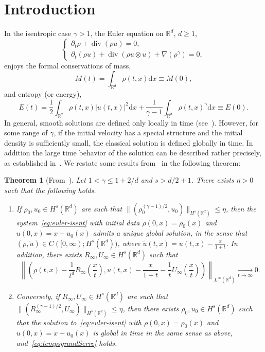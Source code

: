 \documentclass[11pt]{article}
\newtheorem{theo}{Theorem}[section]
\theoremstyle{definition}
\numberwithin{equation}{section}
\numberwithin{figure}{section}
\numberwithin{table}{section}
\DeclareMathOperator{\DIV}{div}
\newcommand*\R{\mathbb{R}}
\newcommand*\dd {\mathrm{d}}
\newcommand*\<{\left\langle}
\renewcommand*\>{\right\rangle}
\renewcommand*\le{\leqslant}
\renewcommand*\ge{\geqslant}
\newcommand*\Tend[2]{\mathop{\longrightarrow}\limits_{#1\rightarrow#2}}
\begin{document}
\section{Introduction}\label{sec:intro}

In the isentropic case $\gamma>1$, the Euler equation on $\R^d$, $d\ge 1$,
\begin{equation}\label{eq:euler-isent}
\begin{cases}
\partial_t \rho+\DIV\left(\rho u\right)=0,\\
\partial_t (\rho u) +\DIV(\rho u\otimes u)+\nabla
\left(\rho^\gamma\right)= 0,
\end{cases}
\end{equation}
enjoys the formal conservations of mass,
\begin{equation*}
M(t) =\int_{\R^d}\rho(t,x)\dd x\equiv M(0),
\end{equation*}
and entropy (or energy),
\begin{equation*}
E(t) = \frac{1}{2}\int_{\R^d} \rho (t,x) |u(t,x)|^2 \dd x+\frac{1}{\gamma-1}\int_{\R^d}\rho(t,x)^\gamma
\dd x \equiv E(0).
\end{equation*}
In general, smooth solutions are defined only locally in time (see~\cite{MUK86,JYC90,Xin98}). However, for some range of $\gamma$, if the initial velocity has a special structure and the initial density is sufficiently small, the classical solution is defined globally in time. In addition the large time behavior of the solution can be described rather precisely, as established in~\cite{Serre97}. We restate some results from~\cite{Serre97} in the following theorem:
\begin{theo}[From~\cite{Serre97}]\label{theo:serre}
Let $1<\gamma\le 1+2/d$ and $s>d/2+1$. There exists $\eta>0$ such that the following holds.
\begin{enumerate}
\item \label{1.1.1} If $\rho_0,u_0\in H^s(\R^d)$ are such that $\|(\rho_0^{(\gamma-1)/2},u_0)\|_{H^s(\R^d)}\le \eta $, then the system~\eqref{eq:euler-isent} with initial data $\rho(0,x) = \rho_0(x)$ and $u(0,x) = x + u_0(x)$ admits a unique global solution, in the sense that $(\rho,\tilde u)\in C([0,\infty);H^s(\R^d))$, where $\tilde u(t,x)=u(t,x)-\frac{x}{1+t}$. In addition, there exists $R_\infty,U_\infty\in H^s(\R^d)$ such that
\begin{equation}\label{eq:tempsgrandSerre}
\left\| \left(\rho (t,x)-\frac{1}{t^d}R_\infty\left(\frac{x}{t}\right),u(t,x) -\frac{x}{1+t}-\frac{1}{t}U_\infty
\left(\frac{x}{t}\right)\right)\right\|_{L^\infty(\R^d)}\Tend t \infty 0.
\end{equation}
\item \label{1.1.2} Conversely, if $R_\infty,U_\infty\in H^s(\R^d)$ are such that $\|(R_\infty^{(\gamma-1)/2},U_\infty)\|_{H^s(\R^d)}\le \eta$, then there exists $\rho_0,u_0\in H^s(\R^d)$ such that the solution to~\eqref{eq:euler-isent} with $ \rho(0,x)=\rho_0(x)$ and $ u(0,x) = x+u_0(x)$ is global in time in the same sense as above, and~\eqref{eq:tempsgrandSerre} holds.
\end{enumerate}
\end{theo}
\end{document}
